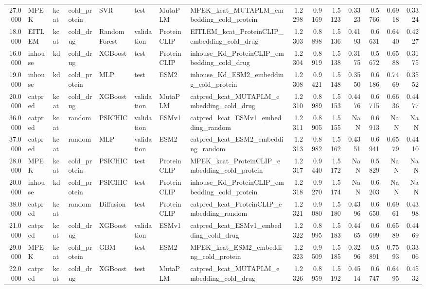 \begin{tabular}{rlllllllrrrrrrr}
27.0000 & MPEK & kcat & cold_protein & SVR & test & MutaPLM & MPEK_kcat_MUTAPLM_embedding_cold_protein & 1.2298 & 0.9169 & 1.5123 & 0.3323 & 0.5766 & 0.6918 & 0.3324 \\
18.0000 & EITLEM & kcat & cold_drug & Random Forest & validation & ProteinCLIP & EITLEM_kcat_ProteinCLIP_embedding_cold_drug & 1.2303 & 0.8898 & 1.5136 & 0.4193 & 0.6631 & 0.6440 & 0.4227 \\
16.0000 & inhouse & kd & cold_drug & XGBoost & test & ProteinCLIP & inhouse_Kd_ProteinCLIP_embedding_cold_drug & 1.2304 & 0.8919 & 1.5138 & 0.3175 & 0.5672 & 0.6588 & 0.3175 \\
19.0000 & inhouse & kd & cold_protein & MLP & test & ESM2 & inhouse_Kd_ESM2_embedding_cold_protein & 1.2308 & 0.9421 & 1.5148 & 0.3550 & 0.6186 & 0.7469 & 0.3552 \\
20.0000 & catpred & kcat & cold_drug & XGBoost & validation & MutaPLM & catpred_kcat_MUTAPLM_embedding_cold_drug & 1.2310 & 0.8989 & 1.5153 & 0.4476 & 0.6715 & 0.6636 & 0.4477 \\
36.0000 & catpred & kcat & random & PSICHIC & validation & ESMv1 & catpred_kcat_ESMv1_embedding_random & 1.2311 & 0.8905 & 1.5155 & NaN & 0.6913 & NaN & NaN \\
37.0000 & catpred & kcat & random & MLP & validation & ESM2 & catpred_kcat_ESM2_embedding_random & 1.2313 & 0.8982 & 1.5162 & 0.4351 & 0.6941 & 0.6579 & 0.4410 \\
28.0000 & MPEK & kcat & cold_protein & PSICHIC & test & ProteinCLIP & MPEK_kcat_ProteinCLIP_embedding_cold_protein & 1.2317 & 0.9440 & 1.5172 & NaN & 0.5829 & NaN & NaN \\
20.0000 & inhouse & kd & cold_protein & PSICHIC & test & ProteinCLIP & inhouse_Kd_ProteinCLIP_embedding_cold_protein & 1.2318 & 0.9270 & 1.5174 & NaN & 0.6203 & NaN & NaN \\
38.0000 & catpred & kcat & random & Diffusion & test & ProteinCLIP & catpred_kcat_ProteinCLIP_embedding_random & 1.2321 & 0.9080 & 1.5180 & 0.4396 & 0.6650 & 0.6961 & 0.4398 \\
21.0000 & catpred & kcat & cold_drug & XGBoost & validation & ESMv1 & catpred_kcat_ESMv1_embedding_cold_drug & 1.2322 & 0.8995 & 1.5183 & 0.4465 & 0.6699 & 0.6589 & 0.4469 \\
29.0000 & MPEK & kcat & cold_protein & GBM & test & ESM2 & MPEK_kcat_ESM2_embedding_cold_protein & 1.2323 & 0.9509 & 1.5185 & 0.3296 & 0.5891 & 0.7593 & 0.3306 \\
22.0000 & catpred & kcat & cold_drug & XGBoost & test & MutaPLM & catpred_kcat_MUTAPLM_embedding_cold_drug & 1.2326 & 0.8959 & 1.5192 & 0.4514 & 0.6747 & 0.6495 & 0.4532 \\

\end{tabular}
